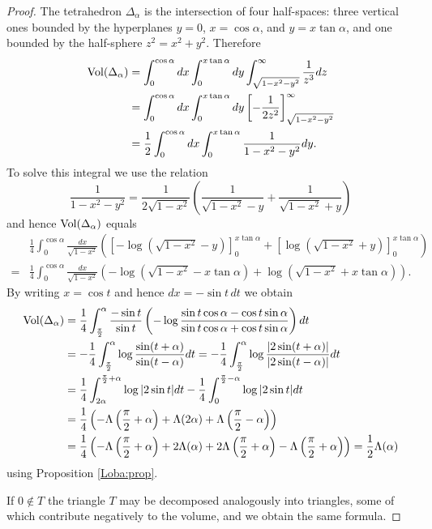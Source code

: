 \begin{proof}
The tetrahedron $\Delta_\alpha$ is the intersection of four half-spaces: three vertical ones bounded by the hyperplanes $y=0$, $x=\cos\alpha$, and $y=x\tan\alpha$, and one bounded by the half-sphere $z^2 = x^2+y^2$. Therefore
\begin{align*}
{\rm Vol}(\Delta_\alpha) & = \int_0^{\cos\alpha} dx \int_0^{x\tan \alpha} dy \int_{\sqrt{1-x^2-y^2}}^\infty \frac 1{z^3} dz \\
& = \int_0^{\cos\alpha} dx \int_0^{x\tan \alpha} dy \left[- \frac 1{2z^2} \right]_{\sqrt{1-x^2-y^2}}^\infty \\
& = \frac 12 \int_0^{\cos \alpha}dx \int_0^{x\tan\alpha}\frac 1{1-x^2-y^2}dy. 
\end{align*}
To solve this integral we use the relation 
$$\frac 1{1-x^2-y^2} = \frac 1{2\sqrt{1-x^2}} \left(\frac 1{\sqrt{1-x^2}-y} + \frac 1{\sqrt{1-x^2}+y}\right)$$
and hence ${\rm Vol}(\Delta_\alpha)$ equals
\begin{align*}
& \frac 14\int_0^{\cos\alpha} \!\!\!\!\!\! \frac {dx}{\sqrt{1-x^2}} 
\left(\left[-\log(\sqrt{1-x^2}-y)\right]_0^{x\tan \alpha} \!\!\!\!\! + \left[\log(\sqrt{1-x^2}+y)\right]_0^{x\tan\alpha}\right) \\
= & \frac 14 \int_0^{\cos\alpha} \!\!\!\!\! \frac{dx}{\sqrt{1-x^2}}
 \left(-\log(\sqrt{1-x^2}-x\tan\alpha)+\log(\sqrt{1-x^2}+x\tan\alpha)\right).
 \end{align*}
By writing $x=\cos t$ and hence $dx = -\sin t \, dt$ we obtain
\begin{align*} 
{\rm Vol}(\Delta_\alpha)  & = \frac 14 \int_{\frac\pi 2}^\alpha \frac{-\sin t}{\sin t} 
\left(-\log \frac{\sin t\cos\alpha - \cos t\sin \alpha}{\sin t \cos\alpha + \cos t \sin \alpha} \right) dt \\
 & = - \frac 14 \int_{\frac \pi 2}^\alpha \log \frac{\sin(t+\alpha)}{\sin(t-\alpha)}dt
 = - \frac 14 \int_{\frac \pi 2}^\alpha \log \frac{|2\sin(t+\alpha)|}{|2\sin(t-\alpha)|}dt \\
 & = \frac 14 \int_{2\alpha}^{\frac \pi 2+\alpha} \log | 2\sin t|dt - \frac 14 \int_0^{\frac \pi 2-\alpha} \log |2\sin t|dt \\
& = \frac 14\left(-\Lambda\left(\frac \pi 2 + \alpha \right) + \Lambda(2\alpha) + \Lambda\left(\frac \pi 2 - \alpha\right) \right) \\
& = \frac 14 \left(-\Lambda \left(\frac \pi 2 + \alpha \right) +2 \Lambda(\alpha) +2\Lambda\left(\frac \pi 2 + \alpha\right) - \Lambda\left(\frac \pi 2 + \alpha\right) \right) = \frac 12 \Lambda(\alpha)
\end{align*}
using Proposition \ref{Loba:prop}.

If $0\not \in T$ the triangle $T$ may be decomposed analogously into triangles, some of which contribute negatively to the volume, and we obtain the same formula.
\end{proof}


